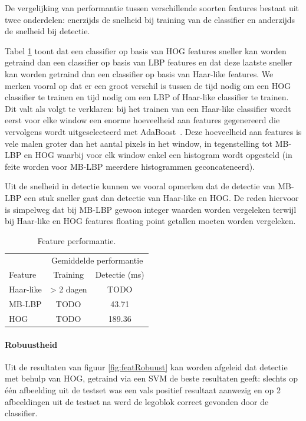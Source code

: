 De vergelijking van performantie tussen verschillende soorten features bestaat uit twee onderdelen: enerzijds de snelheid bij training van de classifier en anderzijds de snelheid bij detectie. 

Tabel \ref{tab:feat_perf} toont dat een classifier op basis van HOG features sneller kan worden getraind dan een classifier op basis van LBP features en dat deze laatste sneller kan worden getraind dan een classifier op basis van Haar-like features. We merken vooral op dat er een groot verschil is tussen de tijd nodig om een HOG classifier te trainen en tijd nodig om een LBP of Haar-like classifier te trainen. Dit valt als volgt te verklaren: bij het trainen van een Haar-like classifier wordt eerst voor elke window een enorme hoeveelheid aan features gegenereerd die vervolgens wordt uitgeselecteerd met AdaBoost~\cite{freund1995desicion}. Deze hoeveelheid aan features is vele malen groter dan het aantal pixels in het window, in tegenstelling tot MB-LBP en HOG waarbij voor elk window enkel een histogram wordt opgesteld (in feite worden voor MB-LBP meerdere histogrammen geconcateneerd).

Uit de snelheid in detectie kunnen we vooral opmerken dat de detectie van MB-LBP een stuk sneller gaat dan detectie van Haar-like en HOG. De reden hiervoor is simpelweg dat bij MB-LBP gewoon integer waarden worden vergeleken terwijl bij Haar-like en HOG features floating point getallen moeten worden vergeleken. 

\begin{table}
  \centering
  \begin{tabular}{@{}lcc@{}} \toprule
    & \multicolumn{2}{c}{Gemiddelde performantie} \\ \cmidrule(r){2-3}
    Feature & Training & Detectie (ms)\\ \midrule
    Haar-like & > 2 dagen & TODO \\
    MB-LBP & TODO & 43.71 \\
    HOG & TODO & 189.36 \\ \bottomrule
  \end{tabular}
  \caption{Feature performantie.}
  \label{tab:feat_perf}
\end{table}

\paragraph{Robuustheid}

Uit de resultaten van figuur \ref{fig:featRobuust} kan worden afgeleid dat detectie met behulp van HOG, getraind via een SVM de beste resultaten geeft: slechts op \'e\'en afbeelding uit de testset was een vals positief resultaat aanwezig en op 2 afbeeldingen uit de testset na werd de legoblok correct gevonden door de classifier.


